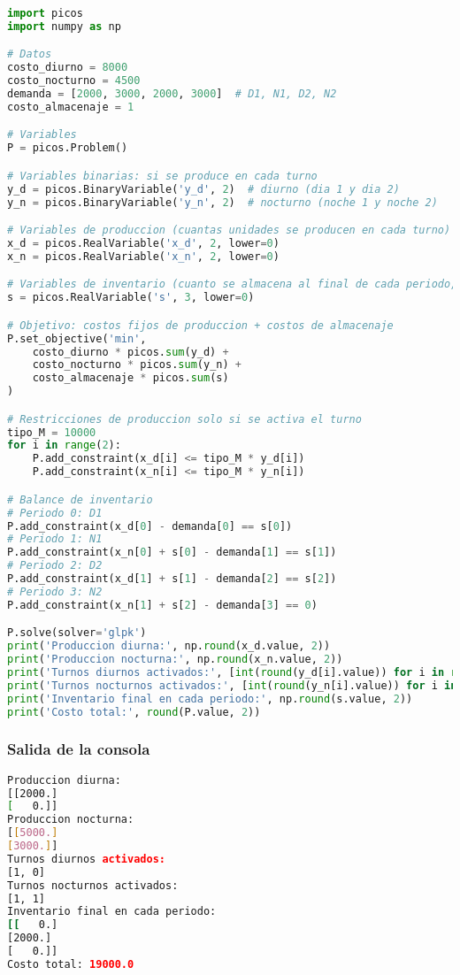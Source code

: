 \documentclass[12pt]{article}
\begin{document}
\begin{lstlisting}[language=Python]
import picos
import numpy as np

# Datos
costo_diurno = 8000
costo_nocturno = 4500
demanda = [2000, 3000, 2000, 3000]  # D1, N1, D2, N2
costo_almacenaje = 1

# Variables
P = picos.Problem()

# Variables binarias: si se produce en cada turno
y_d = picos.BinaryVariable('y_d', 2)  # diurno (dia 1 y dia 2)
y_n = picos.BinaryVariable('y_n', 2)  # nocturno (noche 1 y noche 2)

# Variables de produccion (cuantas unidades se producen en cada turno)
x_d = picos.RealVariable('x_d', 2, lower=0)
x_n = picos.RealVariable('x_n', 2, lower=0)

# Variables de inventario (cuanto se almacena al final de cada periodo, 3 momentos)
s = picos.RealVariable('s', 3, lower=0)

# Objetivo: costos fijos de produccion + costos de almacenaje
P.set_objective('min',
    costo_diurno * picos.sum(y_d) +
    costo_nocturno * picos.sum(y_n) +
    costo_almacenaje * picos.sum(s)
)

# Restricciones de produccion solo si se activa el turno
tipo_M = 10000
for i in range(2):
    P.add_constraint(x_d[i] <= tipo_M * y_d[i])
    P.add_constraint(x_n[i] <= tipo_M * y_n[i])

# Balance de inventario
# Periodo 0: D1
P.add_constraint(x_d[0] - demanda[0] == s[0])
# Periodo 1: N1
P.add_constraint(x_n[0] + s[0] - demanda[1] == s[1])
# Periodo 2: D2
P.add_constraint(x_d[1] + s[1] - demanda[2] == s[2])
# Periodo 3: N2
P.add_constraint(x_n[1] + s[2] - demanda[3] == 0)

P.solve(solver='glpk')
print('Produccion diurna:', np.round(x_d.value, 2))
print('Produccion nocturna:', np.round(x_n.value, 2))
print('Turnos diurnos activados:', [int(round(y_d[i].value)) for i in range(2)])
print('Turnos nocturnos activados:', [int(round(y_n[i].value)) for i in range(2)])
print('Inventario final en cada periodo:', np.round(s.value, 2))
print('Costo total:', round(P.value, 2))
\end{lstlisting}

\subsubsection{Salida de la consola}

\begin{lstlisting}[language=bash,backgroundcolor=\color{black},basicstyle=\color{white}\ttfamily,numbers=none]
Produccion diurna:
[[2000.]
[   0.]]
Produccion nocturna:
[[5000.]
[3000.]]
Turnos diurnos activados:
[1, 0]
Turnos nocturnos activados:
[1, 1]
Inventario final en cada periodo:
[[   0.]
[2000.]
[   0.]]
Costo total: 19000.0
\end{lstlisting}
\end{document}
